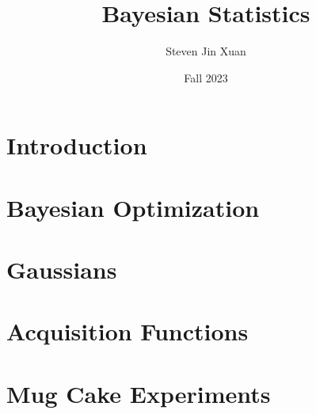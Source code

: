 \documentclass{article}[12, letterpaper]
\author{Steven Jin Xuan}
\date{Fall 2023}
\title{Bayesian Statistics}
\begin{document}

\section{Introduction}

\section{Bayesian Optimization}

\section{Gaussians}




\section{Acquisition Functions}

\section{Mug Cake Experiments}


\pagebreak
{}

\end{document}
